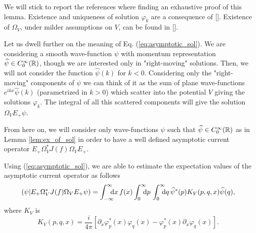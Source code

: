 We will stick to report the references where finding an exhaustive proof of this lemma. Existence and uniqueness of solution $\varphi_k$ are a consequence of [\citealp[Chap. 5, Lemma 1.1]{scattering}]. Existence of $\Omega_V$, under milder assumptions on $V$, can be found in [\citealp[Chap. 5, Theorem 1.12]{scattering}].\\
\begin{oss}
	Let us dwell further on the meaning of Eq. (\ref{eq:asymptotic_sol}). We are considering a smooth wave-function $\psi$ with momentum representation $\widehat{\psi}\in C^\infty_0({\mathbb R})$, though we are interested only in "right-moving" solutions. Then, we will not consider the function $\hat{\psi}(k)$ for $k<0$. Considering only the "right-moving" components of $\psi$ we can think of it as the sum of plane wave-functions $e^{ikx}\hat{\psi}(k)$ (parametrized in $k>0$) which scatter into the potential $V$ giving the solutions $\varphi_k$. The integral of all this scattered components will give the solution $\Omega_VE_+\psi$.%
\end{oss}
\begin{rem}
	From here on, we will consider only wave-functions $\psi$ such that $\widehat{\psi}\in C^\infty_0({\mathbb R})$ as in Lemma \ref{lem:ex_of_sol} in order to have a well defined asymptotic current operator $E_+\Omega_V^*J(f)\Omega_VE_+$.
\end{rem}

\begin{oss}
	Using (\ref{eq:asymptotic_sol}), we are able to estimate the expectation values of the asymptotic current operator as follows
	\begin{equation}
	(\psi|E_+\Omega^*_VJ(f)\Omega_VE_+\psi)=\int_{-\infty}^{\infty}\nspace\!\dd x\,f(x)\int_{0}^{\infty}\nspace\!\dd p\,\int_{0}^{\infty}\nspace\!\dd q\, \hat{\psi}^*(p)K_V(p,q,x)\hat{\psi}(q),
	\label{eq:density_product}
	\end{equation}
	where $K_V$ is
	\begin{equation}
	K_V(p,q,x)=\frac{i}{4\pi}[\partial_x\varphi_p^*(x)\varphi_q(x)-\varphi_p^*(x)\partial_x\varphi_q(x)].
	\label{eq:K_V}
	\end{equation}
\end{oss}

